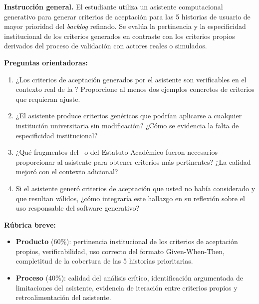 \begin{tcolorbox}[actividadIA,
  title={Actividad de reflexión (Sprint~3) —
         Software generativo y validación de requisitos}]

\textbf{Instrucción general.}
El estudiante utiliza un asistente computacional generativo para generar
criterios de aceptación para las 5 historias de usuario de mayor prioridad
del \textit{backlog} refinado. Se evalúa la pertinencia y la especificidad
institucional de los criterios generados en contraste con los criterios
propios derivados del proceso de validación con actores reales o simulados.

\bigskip
\textbf{Preguntas orientadoras:}
\begin{enumerate}[label=\arabic*.]
  \item ¿Los criterios de aceptación generados por el asistente son
        verificables en el contexto real de la \ud? Proporcione al menos
        dos ejemplos concretos de criterios que requieran ajuste.
  \item ¿El asistente produce criterios genéricos que podrían aplicarse
        a cualquier institución universitaria sin modificación? ¿Cómo
        se evidencia la falta de especificidad institucional?
  \item ¿Qué fragmentos del \acuerdo\ o del Estatuto Académico fueron
        necesarios proporcionar al asistente para obtener criterios más
        pertinentes? ¿La calidad mejoró con el contexto adicional?
  \item Si el asistente generó criterios de aceptación que usted no había
        considerado y que resultan válidos, ¿cómo integraría este hallazgo
        en su reflexión sobre el uso responsable del software generativo?
\end{enumerate}

\bigskip
\textbf{Rúbrica breve:}
\begin{itemize}
  \item \textbf{Producto} (60\%): pertinencia institucional de los
        criterios de aceptación propios, verificabilidad, uso correcto
        del formato Given-When-Then, completitud de la cobertura de las
        5 historias prioritarias.
  \item \textbf{Proceso} (40\%): calidad del análisis crítico,
        identificación argumentada de limitaciones del asistente,
        evidencia de iteración entre criterios propios y retroalimentación
        del asistente.
\end{itemize}

\end{tcolorbox}
